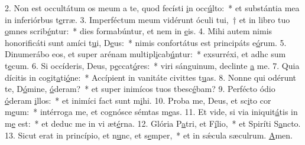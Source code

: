 2. Non est occultátum os meum a te, quod fecísti \uline{i}n occ\uline{ú}lto:~* et substántia mea in inferiórbus t\uline{e}rræ.
3. Imperféctum meum vidérunt óculi tui,~† et in libro tuo \uline{o}mnes scrib\uline{é}ntur:~* dies formabúntur, et nem in \uline{e}is.
4. Mihi autem nimis honorificáti sunt amíci t\uline{u}i, D\uline{e}us:~* nimis confortátus est principáts e\uline{ó}rum.
5. Dinumerábo eos, et super arénam multipl\uline{i}cab\uline{ú}ntur:~* exsurréxi, et adhc sum t\uline{e}cum.
6. Si occíderis, Deus, p\uline{e}ccat\uline{ó}res:~* viri sánguinum, declinte \uline{a} me.
7. Quia dícitis in cogit\uline{a}ti\uline{ó}ne:~* Accípient in vanitáte civittes t\uline{u}as.
8. Nonne qui odérunt te, D\uline{ó}mine, \uline{ó}deram?~* et super inimícos tuos tbesc\uline{é}bam?
9. Perfécto ódio \uline{ó}deram \uline{i}llos:~* et inimíci fact sunt m\uline{i}hi.
10. Proba me, Deus, et sc\uline{i}to cor m\uline{e}um:~* intérroga me, et cognósce sémtas m\uline{e}as.
11. Et vide, si via iniquit\uline{á}tis in m\uline{e} est:~* et deduc me in vi æt\uline{é}rna.
12. Glória P\uline{a}tri, et F\uline{í}lio,~* et Spiríti S\uline{a}ncto.
13. Sicut erat in princípio, et n\uline{u}nc, et s\uline{e}mper,~* et in sǽcula sæculrum. \uline{A}men.
